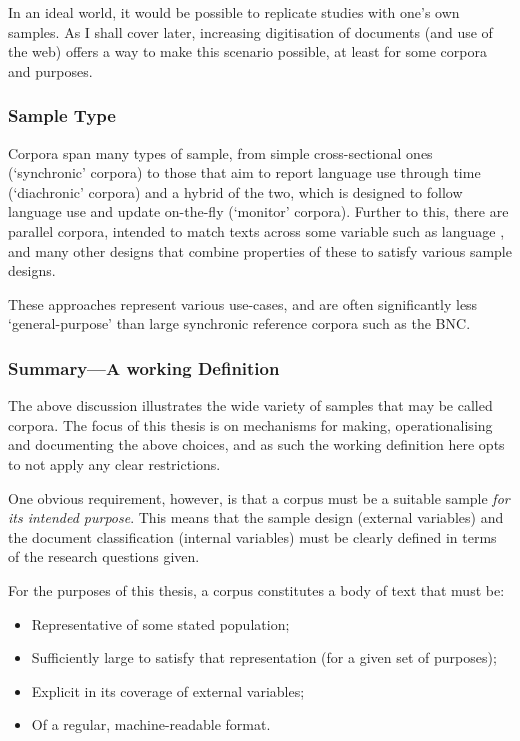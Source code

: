 In an ideal world, it would be possible to replicate studies with one's own samples.  As I shall cover later, increasing digitisation of documents (and use of the web) offers a way to make this scenario possible, at least for some corpora and purposes.



\subsubsection{Sample Type}
Corpora span many types of sample, from simple cross-sectional ones (`synchronic' corpora) to those that aim to report language use through time (`diachronic' corpora) and a hybrid of the two, which is designed to follow language use and update on-the-fly (`monitor' corpora).  Further to this, there are parallel corpora, intended to match texts across some variable such as language
, and many other designs that combine properties of these to satisfy various sample designs.

These approaches represent various use-cases, and are often significantly less `general-purpose' than large synchronic reference corpora such as the BNC.








\subsubsection{Summary---A working Definition}
The above discussion illustrates the wide variety of samples that may be called corpora.  The focus of this thesis is on mechanisms for making, operationalising and documenting the above choices, and as such the working definition here opts to not apply any clear restrictions.

One obvious requirement, however, is that a corpus must be a suitable sample \textsl{for its intended purpose}.  This means that the sample design (external variables) and the document classification (internal variables) must be clearly defined in terms of the research questions given.

For the purposes of this thesis, a corpus constitutes a body of text that must be:

\begin{itemize}
    \item Representative of some stated population;
    \item Sufficiently large to satisfy that representation (for a given set of purposes);
    \item Explicit in its coverage of external variables;
    \item Of a regular, machine-readable format.
\end{itemize}


